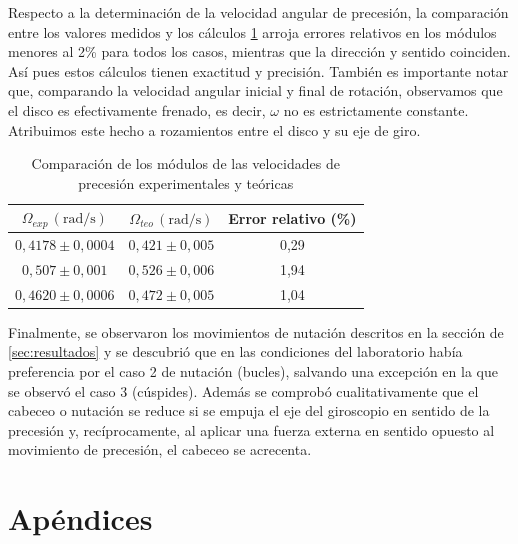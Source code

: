 \documentclass[a4paper]{article}
\begin{document}
Respecto a la determinación de la velocidad angular de precesión, la comparación entre los valores medidos y los cálculos \ref{tab:Omega} arroja errores relativos en los módulos menores al 2\% para todos los casos, mientras que la dirección y sentido coinciden. Así pues estos cálculos tienen exactitud y precisión. También es importante notar que, comparando la velocidad angular inicial y final de rotación, observamos que el disco es efectivamente frenado, es decir, $\omega$ no es estrictamente constante. Atribuimos este hecho a rozamientos entre el disco y su eje de giro.

\begin{table}[h]
\begin{center}
\begin{tabular}{|c|c|c|}
\hline
$\Omega_{exp}\,\left(\text{rad/s}\right)$ & $\Omega_{teo}\,\left(\text{rad/s}\right)$ & Error relativo (\%)\\
\hline
$0,4178\pm 0,0004$ & $0,421\pm 0,005$ & 0,29 \\
\hline
$0,507\pm 0,001$ & $0,526\pm 0,006$ & 1,94\\
\hline
$0,4620\pm 0,0006$ & $0,472\pm 0,005$ & 1,04\\
\hline
\end{tabular}
\caption{Comparación de los módulos de las velocidades de precesión experimentales y teóricas}
\end{center}
\label{tab:Omega}
\end{table}

Finalmente, se observaron los movimientos de nutación descritos en la sección de \ref{sec:resultados} y se descubrió que en las condiciones del laboratorio había preferencia por el caso 2 de nutación (bucles), salvando una excepción en la que se observó el caso 3 (cúspides). Además se comprobó cualitativamente que el cabeceo o nutación se reduce si se empuja el eje del giroscopio en sentido de la precesión y, recíprocamente, al aplicar una fuerza externa en sentido opuesto al movimiento de precesión, el cabeceo se acrecenta.
\section*{Apéndices}
\end{document}
